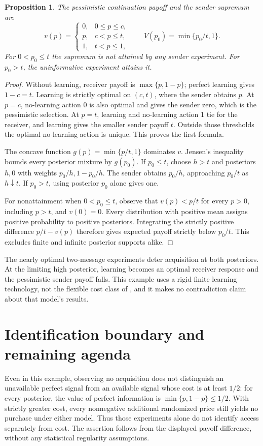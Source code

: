 \documentclass[11pt]{article}
\newtheorem{proposition}[theorem]{Proposition}
\theoremstyle{definition}
\begin{document}
\begin{proposition}
The pessimistic continuation payoff and the sender supremum are
\[
 v(p)=\begin{cases}
 0,&0\le p\le c,\\
 p,&c<p\le t,\\
 1,&t<p\le1,
 \end{cases}
 \qquad
 V(p_0)=\min\{p_0/t,1\}.                               \tag{3}
\]
For $0<p_0\le t$ the supremum is not attained by any sender experiment.
For $p_0>t$, the uninformative experiment attains it.
\end{proposition}
\begin{proof}
Without learning, receiver payoff is $\max\{p,1-p\}$; perfect learning
gives $1-c=t$. Learning is strictly optimal on $(c,t)$, where the sender
obtains $p$. At $p=c$, no-learning action 0 is also optimal and gives
the sender zero, which is the pessimistic selection. At $p=t$, learning
and no-learning action 1 tie for the receiver, and learning gives the
smaller sender payoff $t$. Outside those thresholds the optimal
no-learning action is unique. This proves the first formula.

The concave function $g(p)=\min\{p/t,1\}$ dominates $v$. Jensen's
inequality bounds every posterior mixture by $g(p_0)$. If $p_0\le t$,
choose $h>t$ and posteriors $h,0$ with weights $p_0/h,1-p_0/h$.
The sender obtains $p_0/h$, approaching $p_0/t$ as $h\downarrow t$.
If $p_0>t$, using posterior $p_0$ alone gives one.

For nonattainment when $0<p_0\le t$, observe that
$v(p)<p/t$ for every $p>0$, including $p>t$, and $v(0)=0$.
Every distribution with positive mean assigns positive probability to
positive posteriors. Integrating the strictly positive difference
$p/t-v(p)$ therefore gives expected payoff strictly below $p_0/t$.
This excludes finite and infinite posterior supports alike.
\end{proof}
The nearly optimal two-message experiments deter acquisition at both
posteriors. At the limiting high posterior, learning becomes an optimal
receiver response and the pessimistic sender payoff falls. This example
uses a rigid finite learning technology, not the flexible cost class of
\cite{mm}, and it makes no contradiction claim about that model's results.

\section*{Identification boundary and remaining agenda}
Even in this example, observing no acquisition does not distinguish an
unavailable perfect signal from an available signal whose cost is at least
$1/2$: for every posterior, the value of perfect information is
$\min\{p,1-p\}\le1/2$. With strictly greater cost, every nonnegative
additional randomized price still yields no purchase under either model.
Thus those experiments alone do not identify access separately from cost.
The assertion follows from the displayed payoff difference, without any
statistical regularity assumptions.
\end{document}
